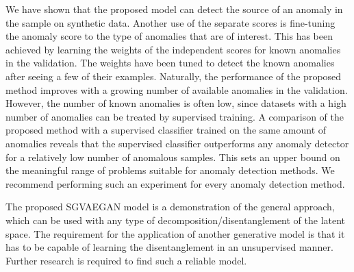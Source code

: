 We have shown that the proposed model can detect the source of an anomaly in the sample on synthetic data. Another use of the separate scores is fine-tuning the anomaly score to the type of anomalies that are of interest. This has been achieved by learning the weights of the independent scores for known anomalies in the validation. The weights have been tuned to detect the known anomalies after seeing a few of their examples. Naturally, the performance of the proposed method improves with a growing number of available anomalies in the validation. However, the number of known anomalies is often low, since datasets with a high number of anomalies can be treated by supervised training. A comparison of the proposed method with a supervised classifier trained on the same amount of anomalies reveals that the supervised classifier outperforms any anomaly detector for a relatively low number of anomalous samples. This sets an upper bound on the meaningful range of problems suitable for anomaly detection methods. We recommend performing such an experiment for every anomaly detection method. 

The proposed SGVAEGAN model is a demonstration of the general approach, which can be used with any type of decomposition/disentanglement of the latent space. The requirement for the application of another generative model is that it has to be capable of learning the disentanglement in an unsupervised manner. Further research is required to find such a reliable model. 
